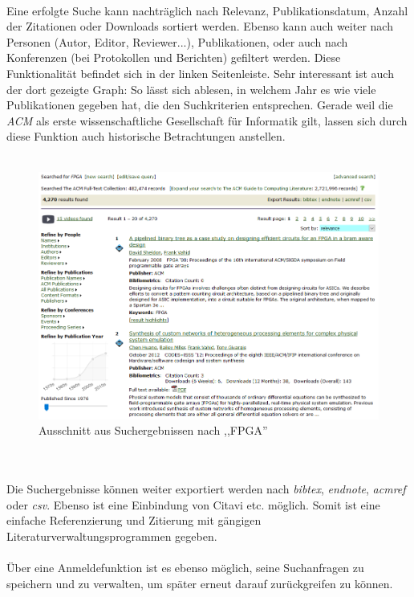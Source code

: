 \documentclass[
	ngerman,
	parskip=half,
	headsepline,
	fontsize=12pt,
	DIV=13,
	listof=leveldown,
	]{scrreprt}
\begin{document}
		\ \\
		Eine erfolgte Suche kann nachträglich nach Relevanz, Publikationsdatum, Anzahl der Zitationen oder Downloads sortiert werden. Ebenso kann auch weiter nach Personen (Autor, Editor, Reviewer...), Publikationen, oder auch nach Konferenzen (bei Protokollen und Berichten) gefiltert werden. Diese Funktionalität befindet sich in der linken Seitenleiste. Sehr interessant ist auch der dort gezeigte Graph: So lässt sich ablesen, in welchem Jahr es wie viele Publikationen gegeben hat, die den Suchkriterien entsprechen. Gerade weil die \textit{ACM} als erste wissenschaftliche Gesellschaft für Informatik gilt, lassen sich durch diese Funktion auch historische Betrachtungen anstellen.
		\ \\
		\ \\
		\begin{figure}[ht]
\centering
\includegraphics[width=\textwidth]{img/suchergebnisse.PNG}
\caption{Ausschnitt aus Suchergebnissen nach ,,FPGA'' {\cite{image:lookupfpgaresults}}}
\end{figure}
\ \\
\ \\
		Die Suchergebnisse können weiter exportiert werden nach \textit{bibtex}, \textit{endnote}, \textit{acmref} oder \textit{csv}. Ebenso ist eine Einbindung von Citavi etc.  möglich. Somit ist eine einfache Referenzierung und Zitierung mit gängigen Literaturverwaltungsprogrammen gegeben.
		\ \\
		\ \\
		Über eine Anmeldefunktion ist es ebenso möglich, seine Suchanfragen zu speichern und zu verwalten, um später erneut darauf zurückgreifen zu können.	
\end{document}
